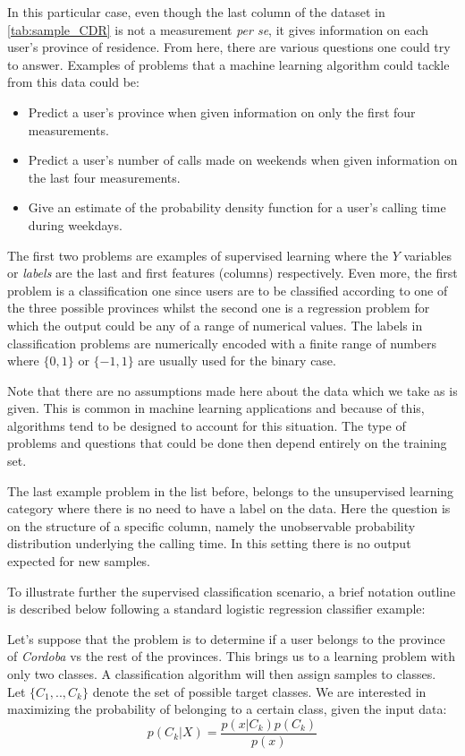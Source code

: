 In this particular case, even though the last column of the dataset in \ref{tab:sample_CDR} is not a measurement \textit{per se}, it gives information on each user's province of residence. From here, there are various questions one could try to answer. Examples of problems that a machine learning algorithm could tackle from this data could be: 

\begin{itemize}
	\item Predict a user's province when given information on only the first four measurements.
	\item Predict a user's number of calls made on weekends when given information on the last four measurements.
	\item Give an estimate of the probability density function for a user's calling time during weekdays.
\end{itemize}

The first two problems are examples of supervised learning where the $Y$ variables or \textit{labels} are the last and first features (columns) respectively. Even more, the first problem is a classification one since users are to be classified according to one of the three possible provinces whilst the second one is a regression problem for which the output could be any of a range of numerical values. The labels in classification problems are numerically encoded with a finite range of numbers where $\{0,1\}$ or $\{-1,1\}$ are usually used for the binary case.

Note that there are no assumptions made here about the data which we take as is given. %
This is common in machine learning applications and because of this, algorithms tend to be designed to account for this situation. The type of problems and questions that could be done then depend entirely on the training set. 

The last example problem in the list before, belongs to the unsupervised learning category where there is no need to have a label on the data. Here the question is on the structure of a specific column, namely the unobservable probability distribution underlying the calling time. In this setting there is no output expected for new samples.

To illustrate further the supervised classification scenario, a brief notation outline is described below following a standard logistic regression classifier example:

Let's suppose that the problem is to determine if a user belongs to the province of \textit{Cordoba} vs the rest of the provinces. This brings us to a learning problem with only two classes. %
A classification algorithm will then assign samples to classes. Let $\{C_1,..,C_k\}$ denote the set of possible target classes. We are  interested in maximizing the probability of belonging to a certain class, given the input data:
$$p(C_k| X) = \frac{p(x|C_k)p(C_k)}{p(x)} $$

